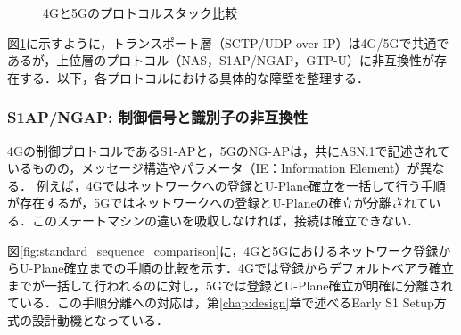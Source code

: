 \begin{figure}[htbp]
\begin{tikzpicture}[scale=0.85, every node/.style={font=\small},
    layer/.style={draw, minimum width=2.8cm, minimum height=0.7cm, align=center},
    label/.style={font=\bfseries\small}]
  \end{tikzpicture}
  \caption{4Gと5Gのプロトコルスタック比較}
  \label{fig:protocol_stack_comparison}
\end{figure}

図\ref{fig:protocol_stack_comparison}に示すように，トランスポート層（SCTP/UDP over IP）は4G/5Gで共通であるが，上位層のプロトコル（NAS，S1AP/NGAP，GTP-U）に非互換性が存在する．以下，各プロトコルにおける具体的な障壁を整理する．

\subsubsection{S1AP/NGAP: 制御信号と識別子の非互換性}
4Gの制御プロトコルであるS1-APと，5GのNG-APは，共にASN.1で記述されているものの，メッセージ構造やパラメータ（IE：Information Element）が異なる．
例えば，4Gではネットワークへの登録とU-Plane確立を一括して行う手順が存在するが，5Gではネットワークへの登録とU-Planeの確立が分離されている．このステートマシンの違いを吸収しなければ，接続は確立できない．

図\ref{fig:standard_sequence_comparison}に，4Gと5Gにおけるネットワーク登録からU-Plane確立までの手順の比較を示す．4Gでは登録からデフォルトベアラ確立までが一括して行われるのに対し，5Gでは登録とU-Plane確立が明確に分離されている．この手順分離への対応は，第\ref{chap:design}章で述べるEarly S1 Setup方式の設計動機となっている．

